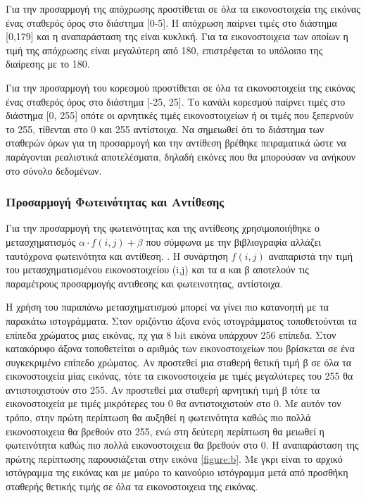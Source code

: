 Για την προσαρμογή της απόχρωσης προστίθεται σε όλα τα εικονοστοιχεία της εικόνας ένας σταθερός όρος στο διάστημα [0-5]. Η απόχρωση παίρνει τιμές στο διάστημα [0,179] και η αναπαράσταση της είναι κυκλική. Για τα εικονοστοιχεια των οποίων η τιμή της απόχρωσης είναι μεγαλύτερη από 180, επιστρέφεται το υπόλοιπο της διαίρεσης με το 180.

Για την προσαρμογή του κορεσμού προστίθεται σε όλα τα εικονοστοιχεία της εικόνας ένας σταθερός όρος στο διάστημα [-25, 25]. Το κανάλι κορεσμού παίρνει τιμές στο διάστημα [0, 255] οπότε  οι αρνητικές τιμές εικονοστοιχείων ή οι τιμές που ξεπερνούν το 255, τίθενται στο 0 και 255 αντίστοιχα. Να σημειωθεί ότι το διάστημα των σταθερών όρων  για τη προσαρμογή και την αντίθεση βρέθηκε πειραματικά ώστε να παράγονται ρεαλιστικά αποτελέσματα, δηλαδή εικόνες που θα μπορούσαν να ανήκουν στο σύνολο δεδομένων. 

\subsubsection{Προσαρμογή Φωτεινότητας και Αντίθεσης}
\label{subsubsec:5.1.2.3}


Για την προσαρμογή της φωτεινότητας και της αντίθεσης χρησιμοποιήθηκε ο μετασχηματισμός $α \cdot  f(i, j) +β$ που σύμφωνα με την βιβλιογραφία αλλάζει ταυτόχρονα φωτεινότητα και αντίθεση. \cite{Szeliski} \cite{Changing}. Η συνάρτηση $f(i,j)$ αναπαριστά την τιμή του μετασχηματισμένου εικονοστοιχείου (i,j) και τα α και β αποτελούν τις παραμέτρους προσαρμογής αντιθεσης και φωτεινοτητας, αντίστοιχα. 

Η χρήση του παραπάνω  μετασχηματισμού μπορεί να γίνει πιο κατανοητή με τα παρακάτω ιστογράμματα. Στον οριζόντιο άξονα ενός ιστογράμματος τοποθετούνται τα επίπεδα χρώματος μιας εικόνας, πχ για 8 bit εικόνα υπάρχουν 256 επίπεδα. Στον κατακόρυφο άξονα τοποθετείται ο αριθμός των εικονοστοιχείων που βρίσκεται σε ένα συγκεκριμένο επίπεδο χρώματος. Αν προστεθεί μια σταθερή θετική τιμή β σε όλα τα εικονοστοιχεία μίας εικόνας, τότε τα εικονοστοιχεία με τιμές μεγαλύτερες του 255 θα αντιστοιχιστούν στο 255. Αν προστεθεί μια σταθερή αρνητική τιμή β τότε τα εικονοστοιχεία με τιμές μικρότερες του 0 θα αντιστοιχιστούν στο 0. Με αυτόν τον τρόπο, στην πρώτη περίπτωση θα αυξηθεί η φωτεινότητα καθώς πιο πολλά εικονοστοιχεια θα βρεθούν στο 255, ενώ στη δεύτερη περίπτωση θα μειωθεί η φωτεινότητα καθώς πιο πολλά εικονοστοιχεια θα βρεθούν στο 0. Η αναπαράσταση της πρώτης περίπτωσης παρουσιάζεται στην εικόνα \ref{figure:b}. Με γκρι είναι το αρχικό ιστόγραμμα της εικόνας και με μαύρο το καινούριο ιστόγραμμα μετά από προσθήκη σταθερής θετικής τιμής σε όλα τα εικονοστοιχεια της εικόνας.

